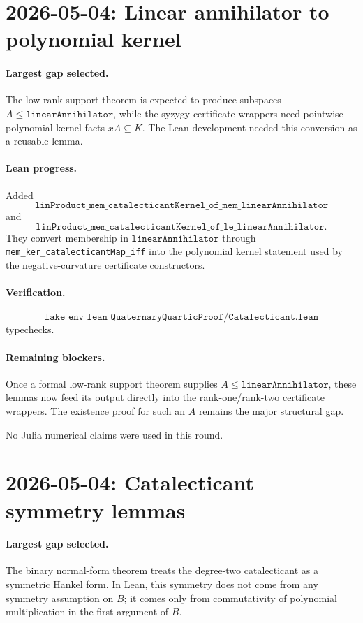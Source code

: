 \documentclass[11pt]{article}
\begin{document}
\section*{2026-05-04: Linear annihilator to polynomial kernel}

\paragraph{Largest gap selected.}
The low-rank support theorem is expected to produce subspaces
\(A\le\texttt{linearAnnihilator}\), while the syzygy certificate wrappers need
pointwise polynomial-kernel facts \(xA\subseteq K\).  The Lean development
needed this conversion as a reusable lemma.

\paragraph{Lean progress.}
Added
\[
\texttt{linProduct\_mem\_catalecticantKernel\_of\_mem\_linearAnnihilator}
\]
and
\[
\texttt{linProduct\_mem\_catalecticantKernel\_of\_le\_linearAnnihilator}.
\]
They convert membership in \(\texttt{linearAnnihilator}\) through
\texttt{mem\_ker\_catalecticantMap\_iff} into the polynomial kernel statement
used by the negative-curvature certificate constructors.

\paragraph{Verification.}
\[
\texttt{lake env lean QuaternaryQuarticProof/Catalecticant.lean}
\]
typechecks.

\paragraph{Remaining blockers.}
Once a formal low-rank support theorem supplies \(A\le
\texttt{linearAnnihilator}\), these lemmas now feed its output directly into
the rank-one/rank-two certificate wrappers.  The existence proof for such an
\(A\) remains the major structural gap.

No Julia numerical claims were used in this round.

\section*{2026-05-04: Catalecticant symmetry lemmas}

\paragraph{Largest gap selected.}
The binary normal-form theorem treats the degree-two catalecticant as a
symmetric Hankel form.  In Lean, this symmetry does not come from any symmetry
assumption on \(B\); it comes only from commutativity of polynomial
multiplication in the first argument of \(B\).
\end{document}

